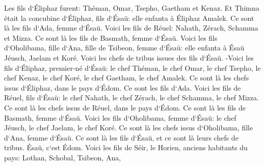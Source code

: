 \verse Les fils d`Éliphaz furent: Théman, Omar, Tsepho, Gaetham et Kenaz. 
\verse Et Thimna était la concubine d`Éliphaz, fils d`Ésaü: elle enfanta à Éliphaz Amalek. Ce sont là les fils d`Ada, femme d`Ésaü. 
\verse Voici les fils de Réuel: Nahath, Zérach, Schamma et Mizza. Ce sont là les fils de Basmath, femme d`Ésaü. 
\verse Voici les fils d`Oholibama, fille d`Ana, fille de Tsibeon, femme d`Ésaü: elle enfanta à Ésaü Jéusch, Jaelam et Koré. 
\verse Voici les chefs de tribus issues des fils d`Ésaü. -Voici les fils d`Éliphaz, premier-né d`Ésaü: le chef Théman, le chef Omar, le chef Tsepho, le chef Kenaz, 
\verse le chef Koré, le chef Gaetham, le chef Amalek. Ce sont là les chefs issus d`Éliphaz, dans le pays d`Édom. Ce sont les fils d`Ada. 
\verse Voici les fils de Réuel, fils d`Ésaü: le chef Nahath, le chef Zérach, le chef Schamma, le chef Mizza. Ce sont là les chefs issus de Réuel, dans le pays d`Édom. Ce sont là les fils de Basmath, femme d`Ésaü. 
\verse Voici les fils d`Oholibama, femme d`Ésaü: le chef Jéusch, le chef Jaelam, le chef Koré. Ce sont là les chefs issus d`Oholibama, fille d`Ana, femme d`Ésaü. 
\verse Ce sont là les fils d`Ésaü, et ce sont là leurs chefs de tribus. Ésaü, c`est Édom. 
\verse Voici les fils de Séir, le Horien, anciens habitants du pays: Lothan, Schobal, Tsibeon, Ana, 
